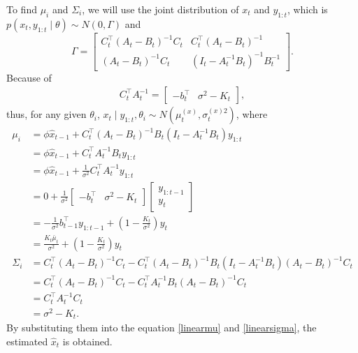 To find $\mu_i$ and $\Sigma_i$, we will use the joint distribution of $x_{t}$ and $y_{1:t}$, which is $p\left(x_{t}, y_{1:t}  \mid  \theta\right)\sim N\left(0,\Gamma\right)$ and 
\begin{equation*}
\Gamma=\begin{bmatrix} C_{t}^\top\left(A_t-B_t\right)^{-1}C_{t} & C_{t}^\top\left(A_t-B_t\right)^{-1}\\\left(A_t-B_t\right)^{-1}C_{t} & \left(I_t-A_t^{-1}B_t\right)^{-1}B_t^{-1} \end{bmatrix}.
\end{equation*}
Because of 
\begin{align*}
C_{t}^\top A_t^{-1} = \begin{bmatrix} - b_{t}^\top & \sigma^2- K_{t} \end{bmatrix},
\end{align*}
thus, for any given $\theta_i$, $x_{t}\mid y_{1:t},\theta_i \sim N\left(\mu_{t}^{\left(x\right)},\sigma_{t}^{\left(x\right)2}\right)$, where
\begin{align*}
\mu_i  &= \phi \hat{x}_{t-1} +  C_{t}^\top \left(A_t-B_t\right)^{-1}B_t \left(I_t-A_t^{-1}B_t\right)y_{1:t}\\
                      &= \phi \hat{x}_{t-1} +  C_{t}^\top A_t^{-1}B_t y_{1:t} \\ &= \phi \hat{x}_{t-1} +  \frac{1}{\sigma^2}C_{t}^\top A_t^{-1} y_{1:t}\\
                      &=0+  \frac{1}{\sigma^2}\begin{bmatrix} - b_{t}^\top & \sigma^2- K_{t} \end{bmatrix} \begin{bmatrix} y_{1:t-1} \\ y_{t} \end{bmatrix}  \\
                      &= - \frac{1}{\sigma^2}b_{t-1}^\top y_{1:t-1}+\left(1-\frac{K_{t}}{\sigma^2}\right)y_{t}\\
                      &=\frac{K_{t}\bar{\mu}_{t}}{\sigma^2}+\left(1-\frac{K_{t}}{\sigma^2}\right)y_{t} \\
\Sigma_i&=C_{t}^\top\left(A_t-B_t\right)^{-1}C_{t}-  C_{t}^\top\left(A_t-B_t\right)^{-1}  B_t\left(I_t-A_t^{-1}B_t\right) \left(A_t-B_t\right)^{-1}C_{t}\\
                      &= C_{t}^\top\left(A_t-B_t\right)^{-1}C_{t} -  C_{t}^\top A_t^{-1}B_t\left(A_t-B_t\right)^{-1}C_{t}\\
                      &= C_{t}^\top A_t^{-1}C_{t} \\ &= \sigma^2-K_{t}.
\end{align*}
By substituting them into the equation \eqref{linearmu} and \eqref{linearsigma}, the estimated $\hat{x}_t$ is obtained. 



